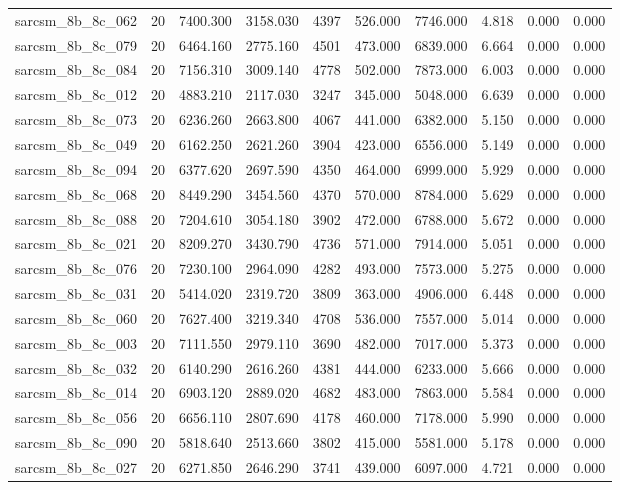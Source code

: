 \begin{tabular}{lrrrrrrrrr}
sarcsm\_8b\_8c\_062 & 20 & 7400.300 & 3158.030 & 4397 & 526.000 & 7746.000 & 4.818 & 0.000 & 0.000 \\
sarcsm\_8b\_8c\_079 & 20 & 6464.160 & 2775.160 & 4501 & 473.000 & 6839.000 & 6.664 & 0.000 & 0.000 \\
sarcsm\_8b\_8c\_084 & 20 & 7156.310 & 3009.140 & 4778 & 502.000 & 7873.000 & 6.003 & 0.000 & 0.000 \\
sarcsm\_8b\_8c\_012 & 20 & 4883.210 & 2117.030 & 3247 & 345.000 & 5048.000 & 6.639 & 0.000 & 0.000 \\
sarcsm\_8b\_8c\_073 & 20 & 6236.260 & 2663.800 & 4067 & 441.000 & 6382.000 & 5.150 & 0.000 & 0.000 \\
sarcsm\_8b\_8c\_049 & 20 & 6162.250 & 2621.260 & 3904 & 423.000 & 6556.000 & 5.149 & 0.000 & 0.000 \\
sarcsm\_8b\_8c\_094 & 20 & 6377.620 & 2697.590 & 4350 & 464.000 & 6999.000 & 5.929 & 0.000 & 0.000 \\
sarcsm\_8b\_8c\_068 & 20 & 8449.290 & 3454.560 & 4370 & 570.000 & 8784.000 & 5.629 & 0.000 & 0.000 \\
sarcsm\_8b\_8c\_088 & 20 & 7204.610 & 3054.180 & 3902 & 472.000 & 6788.000 & 5.672 & 0.000 & 0.000 \\
sarcsm\_8b\_8c\_021 & 20 & 8209.270 & 3430.790 & 4736 & 571.000 & 7914.000 & 5.051 & 0.000 & 0.000 \\
sarcsm\_8b\_8c\_076 & 20 & 7230.100 & 2964.090 & 4282 & 493.000 & 7573.000 & 5.275 & 0.000 & 0.000 \\
sarcsm\_8b\_8c\_031 & 20 & 5414.020 & 2319.720 & 3809 & 363.000 & 4906.000 & 6.448 & 0.000 & 0.000 \\
sarcsm\_8b\_8c\_060 & 20 & 7627.400 & 3219.340 & 4708 & 536.000 & 7557.000 & 5.014 & 0.000 & 0.000 \\
sarcsm\_8b\_8c\_003 & 20 & 7111.550 & 2979.110 & 3690 & 482.000 & 7017.000 & 5.373 & 0.000 & 0.000 \\
sarcsm\_8b\_8c\_032 & 20 & 6140.290 & 2616.260 & 4381 & 444.000 & 6233.000 & 5.666 & 0.000 & 0.000 \\
sarcsm\_8b\_8c\_014 & 20 & 6903.120 & 2889.020 & 4682 & 483.000 & 7863.000 & 5.584 & 0.000 & 0.000 \\
sarcsm\_8b\_8c\_056 & 20 & 6656.110 & 2807.690 & 4178 & 460.000 & 7178.000 & 5.990 & 0.000 & 0.000 \\
sarcsm\_8b\_8c\_090 & 20 & 5818.640 & 2513.660 & 3802 & 415.000 & 5581.000 & 5.178 & 0.000 & 0.000 \\
sarcsm\_8b\_8c\_027 & 20 & 6271.850 & 2646.290 & 3741 & 439.000 & 6097.000 & 4.721 & 0.000 & 0.000 \\

\end{tabular}

